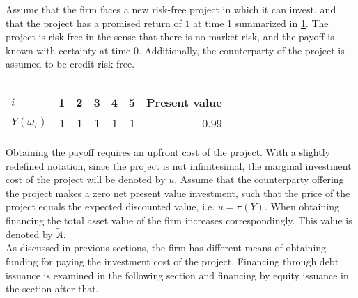 \documentclass[main.tex]{subfiles}
\begin{document}
    Assume that the firm faces a new risk-free project in which it can invest,
    and that the project has a promised return of $\num{1}$ at time 1 summarized in \cref{tbl:single-period-simple-derivative-payoff}.
    The project is risk-free in the sense that there is no market risk,
    and the payoff is known with certainty at time 0.
    Additionally, the counterparty of the project is assumed to be credit risk-free.
        \begin{table}[H]
            \centering
            \begin{tabular}{l|rrrrr||r}
                $i$ & 1 & 2 & 3 & 4 & 5 & Present value\\
                \hline
                $Y(\omega_{i})$ & 
                    \num{1} & \num{1} & \num{1} & \num{1} & \num{1} & \num{0.99}
            \end{tabular}
            \caption{}
            \label{tbl:single-period-simple-derivative-payoff}
        \end{table}
    Obtaining the payoff requires an upfront cost of the project.
    With a slightly redefined notation, since the project is not infinitesimal,
    the marginal investment cost of the project will be denoted by $u$.
    Assume that the counterparty offering the project makes a zero net present value investment, 
    such that the price of the project equals the expected discounted value, i.e. $u = \pi(Y)$.
    When obtaining financing the total asset value of the firm increases correspondingly.
    This value is denoted by $\tilde{A}$.
    \\
    As discussed in previous sections, the firm has different means of obtaining funding
    for paying the investment cost of the project.
    Financing through debt issuance is examined in the following section 
    and financing by equity issuance in the section after that.
\end{document}
